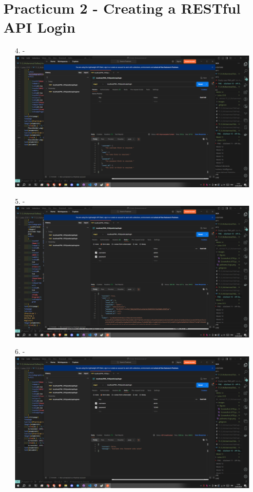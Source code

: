 \documentclass[12pt,titlepage]{article}
\begin{document}
\section{Practicum 2 - Creating a RESTful API Login}
\begin{enumerate}
    \item[4.] - \\ \includegraphics[width=.9\textwidth]{images/figures/Screenshot (475).png}
    \item[5.] - \\ \includegraphics[width=.9\textwidth]{images/figures/Screenshot (476).png}
    \item[6.] - \\ \includegraphics[width=.9\textwidth]{images/figures/Screenshot (477).png}

\end{enumerate}
\end{document}
